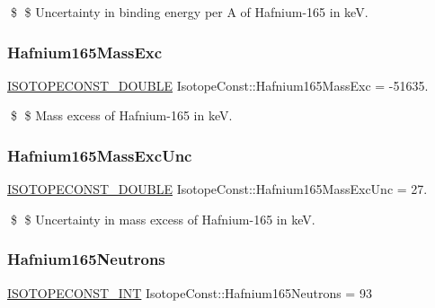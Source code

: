 \$ \$ Uncertainty in binding energy per A of Hafnium-\/165 in keV. \mbox{\label{group___isotope_const-_hafnium-_hf165_ga6eb77886ddc6c2ea49ba6f8a5b5abbe9}} 
\subsubsection{\texorpdfstring{Hafnium165\+Mass\+Exc}{Hafnium165MassExc}}
{\footnotesize\ttfamily \mbox{\hyperlink{group___isotope_const-_macros_ga8f45a7272ce02c0b4c65c44636ed719a}{I\+S\+O\+T\+O\+P\+E\+C\+O\+N\+S\+T\+\_\+\+D\+O\+U\+B\+LE}} Isotope\+Const\+::\+Hafnium165\+Mass\+Exc = -\/51635.}

\$ \$ Mass excess of Hafnium-\/165 in keV. \mbox{\label{group___isotope_const-_hafnium-_hf165_gaf093eff82378364bb53a0016087347d7}} 
\subsubsection{\texorpdfstring{Hafnium165\+Mass\+Exc\+Unc}{Hafnium165MassExcUnc}}
{\footnotesize\ttfamily \mbox{\hyperlink{group___isotope_const-_macros_ga8f45a7272ce02c0b4c65c44636ed719a}{I\+S\+O\+T\+O\+P\+E\+C\+O\+N\+S\+T\+\_\+\+D\+O\+U\+B\+LE}} Isotope\+Const\+::\+Hafnium165\+Mass\+Exc\+Unc = 27.}

\$ \$ Uncertainty in mass excess of Hafnium-\/165 in keV. \mbox{\label{group___isotope_const-_hafnium-_hf165_gae18653797189e4168270d6a44782b2ee}} 
\subsubsection{\texorpdfstring{Hafnium165\+Neutrons}{Hafnium165Neutrons}}
{\footnotesize\ttfamily \mbox{\hyperlink{group___isotope_const-_macros_ga5f18360b3e99483a35c32d789e62621c}{I\+S\+O\+T\+O\+P\+E\+C\+O\+N\+S\+T\+\_\+\+I\+NT}} Isotope\+Const\+::\+Hafnium165\+Neutrons = 93}

